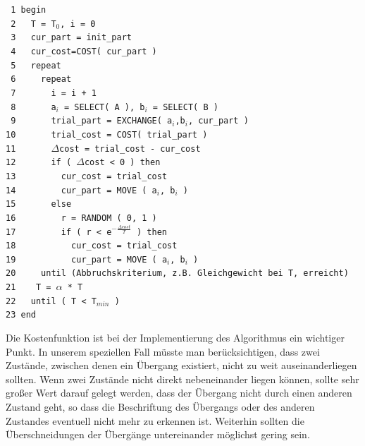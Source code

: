 \noindent
\verb| 1 begin|\\
\verb| 2   T = T|$_0$\verb|, i = 0|\\
\verb| 3   cur_part = init_part|\\
\verb| 4   cur_cost=COST( cur_part )|\\
\verb| 5   repeat|\\
\verb| 6     repeat|\\
\verb| 7       i = i + 1|\\
\verb| 8       a|$_i$\verb| = SELECT( A ), b|$_i$\verb| = SELECT( B )|\\
\verb| 9       trial_part = EXCHANGE( a|$_i$\verb|,b|$_i$\verb|, cur_part )|\\
\verb|10       trial_cost = COST( trial_part )|\\
\verb|11       |$\Delta$\verb|cost = trial_cost - cur_cost|\\
\verb|12       if ( |$\Delta$\verb|cost < 0 ) then|\\
\verb|13         cur_cost = trial_cost|\\
\verb|14         cur_part = MOVE ( a|$_i$\verb|, b|$_i$\verb| )|\\
\verb|15       else|\\
\verb|16         r = RANDOM ( 0, 1 )|\\
\verb|17         if ( r < e|$^{-\frac{\Delta cost}{T}}$\verb| ) then|\\
\verb|18           cur_cost = trial_cost|\\
\verb|19           cur_part = MOVE ( a|$_i$\verb|, b|$_i$\verb| )|\\
\verb|20     until (Abbruchskriterium, z.B. Gleichgewicht bei T, erreicht)|\\
\verb|21    T = |$\alpha$\verb| * T|\\
\verb|22   until ( T < T|$_{min}$\verb| )|\\
\verb|23 end|\\ 
\vspace{10pt}

Die Kostenfunktion ist bei der Implementierung des Algorithmus ein wichtiger
Punkt. In unserem speziellen Fall müsste man berücksichtigen, dass zwei
Zustände, zwischen denen ein Übergang existiert, nicht zu weit auseinanderliegen
sollten. Wenn zwei Zustände nicht direkt nebeneinander liegen können, sollte sehr
großer Wert darauf gelegt werden, dass der Übergang nicht durch einen anderen
Zustand geht, so dass die Beschriftung des Übergangs oder des anderen Zustandes
eventuell nicht mehr zu erkennen ist. Weiterhin sollten die Überschneidungen der
Übergänge untereinander möglichst gering sein.
\vspace{10pt}


